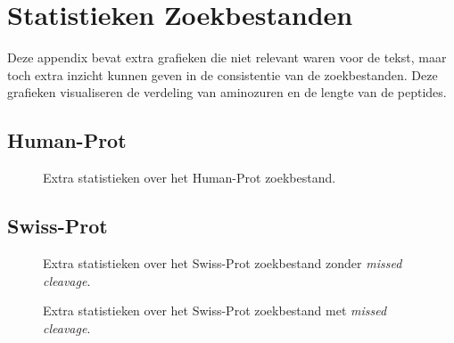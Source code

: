 \chapter{Statistieken Zoekbestanden}\label{ch:appendix-statistieken-zoekbestanden}
Deze appendix bevat extra grafieken die niet relevant waren voor de tekst, maar toch extra inzicht kunnen geven in de consistentie van de zoekbestanden.
Deze grafieken visualiseren de verdeling van aminozuren en de lengte van de peptides.

\section{Human-Prot}\label{sec:human-prot-stats}
\begin{figure}[H]
    \centering
    \hfill
    \caption{Extra statistieken over het Human-Prot zoekbestand.}\label{fig:humanprot_search_other_stats}
\end{figure}

\section{Swiss-Prot}\label{sec:swiss-prot-stats}
\begin{figure}[H]
    \centering
    \hfill
    \caption{Extra statistieken over het Swiss-Prot zoekbestand zonder \textit{missed cleavage}.}\label{fig:swissprot_search_no_missed_cleavage_other_stats}
\end{figure}
\begin{figure}[H]
    \centering
    \hfill
    \caption{Extra statistieken over het Swiss-Prot zoekbestand met \textit{missed cleavage}.}\label{fig:swissprot_search_missed_cleavage_other_stats}
\end{figure}

